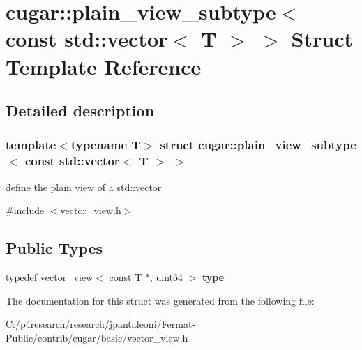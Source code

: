 \hypertarget{structcugar_1_1plain__view__subtype_3_01const_01std_1_1vector_3_01_t_01_4_01_4}{}\section{cugar\+:\+:plain\+\_\+view\+\_\+subtype$<$ const std\+:\+:vector$<$ T $>$ $>$ Struct Template Reference}
\label{structcugar_1_1plain__view__subtype_3_01const_01std_1_1vector_3_01_t_01_4_01_4}


\subsection{Detailed description}
\subsubsection*{template$<$typename T$>$\newline
struct cugar\+::plain\+\_\+view\+\_\+subtype$<$ const std\+::vector$<$ T $>$ $>$}

define the plain view of a std\+::vector 

{\ttfamily \#include $<$vector\+\_\+view.\+h$>$}

\subsection*{Public Types}
\begin{DoxyCompactItemize}
\item 
\mbox{\label{structcugar_1_1plain__view__subtype_3_01const_01std_1_1vector_3_01_t_01_4_01_4_a08e7c3deeed887bef4e45ece1603d993}} 
typedef \hyperlink{structcugar_1_1vector__view}{vector\+\_\+view}$<$ const T $\ast$, uint64 $>$ {\bfseries type}
\end{DoxyCompactItemize}


The documentation for this struct was generated from the following file\+:\begin{DoxyCompactItemize}
\item 
C\+:/p4research/research/jpantaleoni/\+Fermat-\/\+Public/contrib/cugar/basic/vector\+\_\+view.\+h\end{DoxyCompactItemize}
